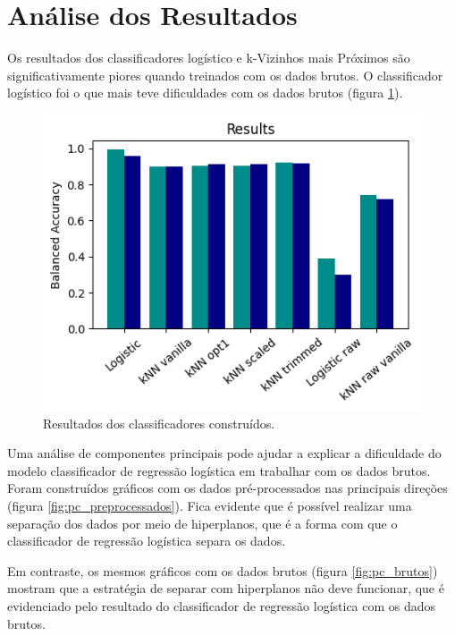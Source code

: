 \documentclass[final,5p]{elsarticle}
\numberwithin{equation}{section}
\begin{document}
\section{Análise dos Resultados}

        Os resultados dos classificadores logístico e k-Vizinhos mais Próximos são significativamente piores quando treinados com os dados brutos. O classificador logístico foi o que mais teve dificuldades com os dados brutos (figura \ref{fig:resultados}).

        \begin{figure}[hbt!]
            \includegraphics[width=0.95\columnwidth]{C_Results.png}
            \caption{Resultados dos classificadores construídos.}
            \label{fig:resultados}
        \end{figure}

        Uma análise de componentes principais pode ajudar a explicar a dificuldade do modelo classificador de regressão logística em trabalhar com os dados brutos. Foram construídos gráficos com os dados pré-processados nas principais direções (figura \ref{fig:pc_preprocessados}). Fica evidente que é possível realizar uma separação dos dados por meio de hiperplanos, que é a forma com que o classificador de regressão logística separa os dados.

        Em contraste, os mesmos gráficos com os dados brutos (figura \ref{fig:pc_brutos}) mostram que a estratégia de separar com hiperplanos não deve funcionar, que é evidenciado pelo resultado do classificador de regressão logística com os dados brutos.
\end{document}
